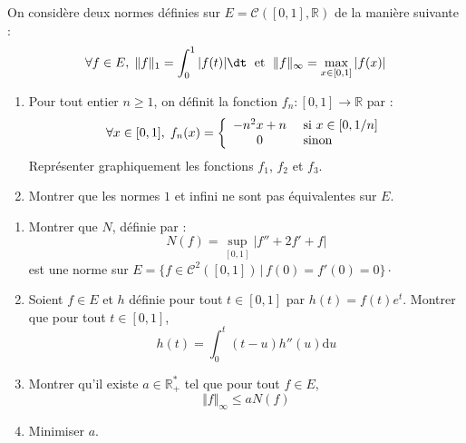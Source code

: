 \documentclass[a4paper,10pt]{report}
\begin{document}
\begin{Exa} On considère deux normes définies sur $E= \mathcal{C}([0,1], \mathbb{R})$ de la manière suivante :
$$ \forall f \in E, \; \Vert f \Vert_1 = \int_0^1 \vert f(t) \vert \dt \; \hbox{ et } \; \Vert f \Vert_{\infty} = \max_{x \in [0,1]} \vert f(x) \vert$$
\begin{enumerate}
\item Pour tout entier $n \geq 1$, on définit la fonction $f_n : [0,1] \rightarrow \mathbb{R}$ par :
$$ \forall x \in [0,1], \; f_n(x) = \left\lbrace \begin{array}{cl}
-n^2x+n & \hbox{ si } x \in [0,1/n] \\
0 & \hbox{ sinon}
\end{array}\right.$$
Représenter graphiquement les fonctions $f_1$, $f_2$ et $f_3$.
\item Montrer que les normes $1$ et infini ne sont pas équivalentes sur $E$.
\end{enumerate}
\end{Exa}

\begin{Exa}[\ding{80}]
\begin{enumerate}
\item Montrer que $N$, définie par :
$$ N(f) = \sup_{[0,1]} \vert f''+2f'+f \vert $$
est une norme sur $E = \lbrace f \in \mathcal{C}^2([0,1]) \, \vert \, f(0)=f'(0)=0 \rbrace \cdot$
\item Soient $f \in E$ et $h$ définie pour tout $t \in [0,1]$ par $h(t)=f(t)e^t$. Montrer que pour tout $t \in [0,1]$,
$$ h(t) = \int_{0}^t (t-u) h''(u) \textrm{d}u$$
\item Montrer qu'il existe $a \in \mathbb{R}_+^{*}$ tel que pour tout $f \in E$,
$$ \Vert f \Vert_{\infty} \leq a N(f)$$
\item Minimiser $a$.
\end{enumerate}
\end{Exa}
\end{document}
